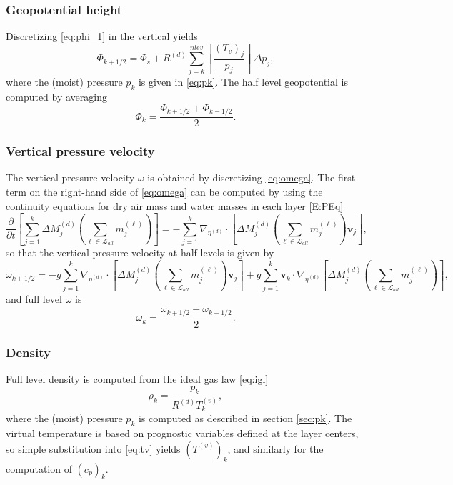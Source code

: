 \documentclass{agujournal}
\begin{document}
\subsubsection{Geopotential height}
Discretizing \eqref{eq:phi_1} in the vertical yields
\begin{equation}
\Phi_{k+1/2}=\Phi_s+R^{(d)}\sum_{j=k}^{nlev} \left[ \frac{(T_v)_j}{p_j}\right]\, \Delta p_j,
\end{equation}
where the (moist) pressure $p_k$ is given in \eqref{eq:pk}. The half level geopotential is computed by averaging
\begin{equation}
\Phi_k=\frac{\Phi_{k+1/2}+\Phi_{k-1/2}}{2}.
\end{equation}
\subsubsection{Vertical pressure velocity}
The vertical pressure velocity $\omega$ is obtained by discretizing \eqref{eq:omega}. The first term on the right-hand side of \eqref{eq:omega} can be computed by using the continuity equations for dry air mass and water masses in each layer \eqref{E:PEq}
\begin{equation}
\frac{\partial }{\partial t}\left[\sum_{j=1}^k \Delta M^{(d)}_j \left( \sum_{\ell \in \mathcal{L}_{all}} m_j^{(\ell)}\right)\right] = -\sum_{j=1}^k \nabla_{\eta^{(d)}}\cdot \left[ \Delta M^{(d)}_j\left(\sum_{\ell \in \mathcal{L}_{all}} m_j^{(\ell)} \right)\mathbf{v}_j\right],
\end{equation}
so that the vertical pressure velocity at half-levels is given by
\begin{equation}
\omega_{k+1/2}=-g\sum_{j=1}^k \nabla_{\eta^{(d)}}\cdot \left[ \Delta M^{(d)}_j\left(\sum_{\ell \in \mathcal{L}_{all}} m_j^{(\ell)} \right)\mathbf{v}_j \right]+g\sum_{j=1}^k \mathbf{v}_k \cdot \nabla_{\eta^{(d)}}\left[ \Delta M^{(d)}_j\left( \sum_{\ell \in \mathcal{L}_{all}} m_j^{(\ell)}\right)\right],
\end{equation}
and full level $\omega$ is
\begin{equation}
\omega_k=\frac{\omega_{k+1/2}+\omega_{k-1/2}}{2}.
\end{equation}
\subsubsection{Density}
Full level density is computed from the ideal gas law \eqref{eq:igl}
\begin{equation}
\rho_k=\frac{p_k}{R^{(d)} T_k^{(v)}},
\end{equation}
where the (moist) pressure $p_k$ is computed as described in section \ref{sec:pk}. The virtual temperature is based on prognostic variables defined at the layer centers, so simple substitution into \eqref{eq:tv} yields $\left(T^{(v)}\right)_k$, and similarly for the computation of $\left( c_p\right)_k$.
\end{document}
